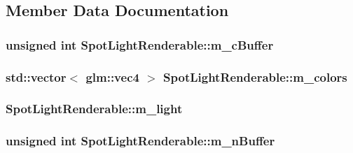 \subsection{Member Data Documentation}
\hypertarget{classSpotLightRenderable_ab8dafa5c0184b6faa93d659d8a7e1d3b}{
\subsubsection[{m\+\_\+c\+Buffer}]{\setlength{\rightskip}{0pt plus 5cm}unsigned int Spot\+Light\+Renderable\+::m\+\_\+c\+Buffer\hspace{0.3cm}{\ttfamily [private]}}}\label{classSpotLightRenderable_ab8dafa5c0184b6faa93d659d8a7e1d3b}
\hypertarget{classSpotLightRenderable_ab15200db61464b5426cae2629c51d47a}{
\subsubsection[{m\+\_\+colors}]{\setlength{\rightskip}{0pt plus 5cm}std\+::vector$<$ glm\+::vec4 $>$ Spot\+Light\+Renderable\+::m\+\_\+colors\hspace{0.3cm}{\ttfamily [private]}}}\label{classSpotLightRenderable_ab15200db61464b5426cae2629c51d47a}
\hypertarget{classSpotLightRenderable_a0aab1ea4d5ece2308a9b66280621d8ff}{
\subsubsection[{m\+\_\+light}]{ Spot\+Light\+Renderable\+::m\+\_\+light\hspace{0.3cm}{\ttfamily [private]}}}\label{classSpotLightRenderable_a0aab1ea4d5ece2308a9b66280621d8ff}
\hypertarget{classSpotLightRenderable_a051d65c46c79b4f43c4098bd443e24a3}{
\subsubsection[{m\+\_\+n\+Buffer}]{\setlength{\rightskip}{0pt plus 5cm}unsigned int Spot\+Light\+Renderable\+::m\+\_\+n\+Buffer\hspace{0.3cm}{\ttfamily [private]}}}\label{classSpotLightRenderable_a051d65c46c79b4f43c4098bd443e24a3}
